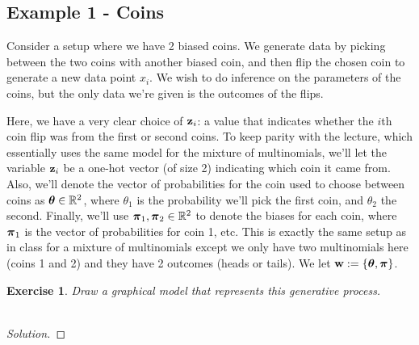 \documentclass[12pt,letterpaper]{article}
\newcommand{\BR}{\mathbb R}
\newtheorem{exercise}{Exercise}
\newenvironment{exercisesolution}
  {\begin{proof}[Solution]}
  {\end{proof}}
\begin{document}
\subsection{Example 1 - Coins}

Consider a setup where we have 2 biased coins. We generate data by picking between the two coins with another biased coin, and then flip the chosen coin to generate a new data point $x_i$. We wish to do inference on the parameters of the coins, but the only data we're given is the outcomes of the flips.

Here, we have a very clear choice of $\mathbf{z}_i$: a value that indicates whether the $i$th coin flip was from the first or second coins. To keep parity with the lecture, which essentially uses the same model for the mixture of multinomials, we'll let the variable $\mathbf{z}_i$ be a one-hot vector (of size 2) indicating which coin it came from. Also, we'll denote the vector of probabilities for the coin used to choose between coins as $\btheta \in \BR^2$, where $\theta_1$ is the probability we'll pick the first coin, and $\theta_2$ the second. Finally, we'll use $\bpi_1, \bpi_2 \in \BR^{2}$  to denote the biases for each coin, where $\boldsymbol{\pi}_1$ is the vector of probabilities for coin 1, etc. This is exactly the same setup as in class for a mixture of multinomials except we only have two multinomials here (coins 1 and 2) and they have 2 outcomes (heads or tails). We let $\mathbf{w} := \{\boldsymbol{\theta}, \boldsymbol{\pi}\}$.



\begin{exercise}
Draw a graphical model that represents this generative process.\\\\
\end{exercise}

\begin{exercisesolution}
\end{exercisesolution}
\vspace{3cm} 
\end{document}
